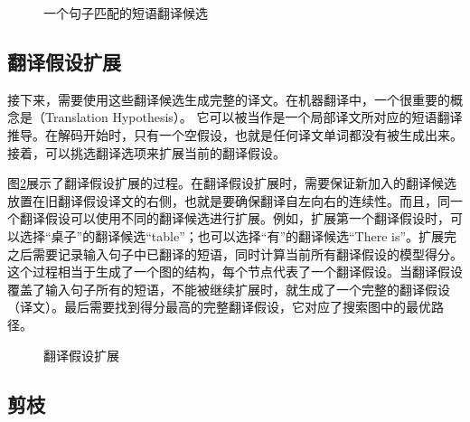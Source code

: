 \begin{figure}[htp]
\centering

\caption{一个句子匹配的短语翻译候选}
\label{fig:7-24}
\end{figure}


\subsection{翻译假设扩展}

\parinterval 接下来，需要使用这些翻译候选生成完整的译文。在机器翻译中，一个很重要的概念是{\small{}}（Translation Hypothesis）。 它可以被当作是一个局部译文所对应的短语翻译推导。在解码开始时，只有一个空假设，也就是任何译文单词都没有被生成出来。接着，可以挑选翻译选项来扩展当前的翻译假设。

\parinterval 图\ref{fig:7-25}展示了翻译假设扩展的过程。在翻译假设扩展时，需要保证新加入的翻译候选放置在旧翻译假设译文的右侧，也就是要确保翻译自左向右的连续性。而且，同一个翻译假设可以使用不同的翻译候选进行扩展。例如，扩展第一个翻译假设时，可以选择“桌子”的翻译候选“table”；也可以选择“有”的翻译候选“There is”。扩展完之后需要记录输入句子中已翻译的短语，同时计算当前所有翻译假设的模型得分。这个过程相当于生成了一个图的结构，每个节点代表了一个翻译假设。当翻译假设覆盖了输入句子所有的短语，不能被继续扩展时，就生成了一个完整的翻译假设（译文）。最后需要找到得分最高的完整翻译假设，它对应了搜索图中的最优路径。

\begin{figure}[htp]
\centering

\caption{翻译假设扩展}
\label{fig:7-25}
\end{figure}


\subsection{剪枝}

